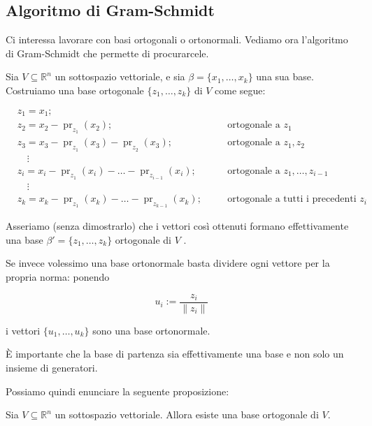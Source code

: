 \documentclass[
  a4paper,
]{article}
\begin{document}
\hypertarget{algoritmo-di-gram-schmidt}{%
\subsection{Algoritmo di Gram-Schmidt}\label{algoritmo-di-gram-schmidt}}

Ci interessa lavorare con basi ortogonali o ortonormali. Vediamo ora
l'algoritmo di Gram-Schmidt che permette di procurarcele.

\bigskip

Sia \(V \subseteq \mathbb{R}^n\) un sottospazio vettoriale, e sia
\(\beta =\{x_1,\ldots,x_k\}\) una sua base. Costruiamo una base
ortogonale \(\{z_1,\ldots,z_k\}\) di \(V\) come segue:

\[
\begin{aligned}
&z_1 = x_1; \\
&z_2 = x_2 - \operatorname{pr}_{z_1}(x_2); &&\quad\text{ortogonale a } z_1 \\
&z_3 = x_3 - \operatorname{pr}_{z_1}(x_3) - \operatorname{pr}_{z_2}(x_3); &&\quad\text{ortogonale a } z_1, z_2 \\
&\quad\vdots \\
&z_i = x_i - \operatorname{pr}_{z_1}(x_i) - \dots - \operatorname{pr}_{z_{i-1}}(x_i);
&&\quad\text{ortogonale a } z_1,\ldots,z_{i-1} \\
&\quad\vdots \\
&z_k = x_k - \operatorname{pr}_{z_1}(x_k) - \dots - \operatorname{pr}_{z_{k-1}}(x_k);
&&\quad\text{ortogonale a tutti i precedenti } z_i
\end{aligned}
\]

Asseriamo (senza dimostrarlo) che i vettori così ottenuti formano
effettivamente una base \(\beta ' =\{z_1,\ldots,z_k\}\) ortogonale di
\(V\) .

Se invece volessimo una base ortonormale basta dividere ogni vettore per
la propria norma: ponendo

\[
u_i := \frac{z_i}{\lVert z_i\rVert}
\]

i vettori \(\{u_1,\ldots,u_k\}\) sono una base ortonormale.

\begin{notebox}
È importante che la base di partenza sia effettivamente una base e non
solo un insieme di generatori.
\end{notebox}

Possiamo quindi enunciare la seguente proposizione:

\begin{propositionbox}
Sia \(V \subseteq \mathbb{R}^n\) un sottospazio vettoriale. Allora
esiste una base ortogonale di \(V\).
\end{propositionbox}
\end{document}
